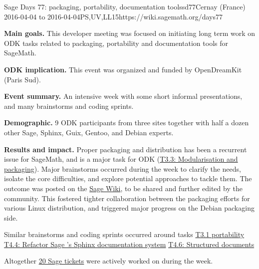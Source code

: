 \begin{event}{Sage Days 77: packaging, portability, documentation tools}{sd77}{Cernay (France) 2016-04-04 to 2016-04-04}{PS,UV,LL}{15}{https://wiki.sagemath.org/days77}

  \textbf{Main goals.} This developer meeting was focused on
  initiating long term work on ODK tasks related to packaging,
  portability and documentation tools for SageMath.

  \textbf{ODK implication.} This event was organized and funded by
  OpenDreamKit (Paris Sud).

  \textbf{Event summary.} An intensive week with some short informal
  presentations, and many brainstorms and coding sprints.

  \textbf{Demographic.} 9 ODK participants from three sites together
  with half a dozen other Sage, Sphinx, Guix, Gentoo, and Debian
  experts.

  \textbf{Results and impact.} Proper packaging and distribution has
  been a recurrent issue for SageMath, and is a major task for ODK
  (\href{https://github.com/OpenDreamKit/OpenDreamKit/issues/52}{T3.3:
    Modularisation and packaging}). Major brainstorms occurred during
  the week to clarify the needs, isolate the core difficulties, and
  explore potential approaches to tackle them. The outcome was posted
  on the \href{https://wiki.sagemath.org/days77/packaging}{Sage Wiki},
  to be shared and further edited by the community. This fostered
  tighter collaboration between the packaging efforts for various
  Linux distribution, and triggered major progress on the Debian
  packaging side.

  Similar brainstorms and coding sprints occurred around tasks
  \href{https://github.com/OpenDreamKit/OpenDreamKit/issues/50}{T3.1 portability}
  \href{https://github.com/OpenDreamKit/OpenDreamKit/issues/72}{T4.4: Refactor Sage 's Sphinx documentation system}
  \href{https://github.com/OpenDreamKit/OpenDreamKit/issues/74}{T4.6: Structured documents}

  Altogether
  \href{https://trac.sagemath.org/query?keywords=~days77&col=id&col=summary&col=status&col=type&col=priority&col=milestone&col=component&order=priority}{20
    Sage tickets} were actively worked on during the week.
\end{event}
